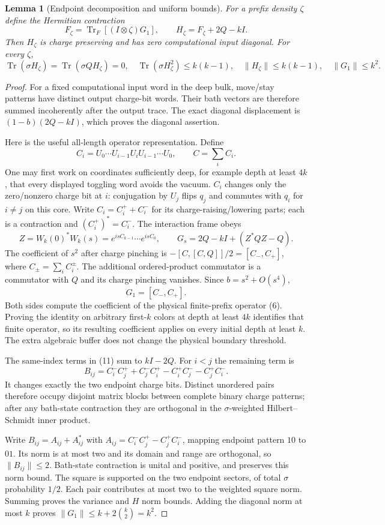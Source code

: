 \documentclass[11pt]{article}
\newtheorem{lemma}[theorem]{Lemma}
\newcommand{\Tr}{\operatorname{Tr}}
\newcommand{\norm}[1]{\lVert #1\rVert}
\begin{document}
\begin{lemma}[Endpoint decomposition and uniform bounds]\label{lem:endpoints}
For a prefix density $\zeta$ define the Hermitian contraction
\[
 F_\zeta=\Tr_F[(I\otimes\zeta)G_1],\qquad
 H_\zeta=F_\zeta+2Q-kI.
 \tag{7}
\]
Then $H_\zeta$ is charge preserving and has zero computational input
diagonal. For every $\zeta$,
\[
 \Tr(\sigma H_\zeta)=\Tr(\sigma QH_\zeta)=0,
 \quad \Tr(\sigma H_\zeta^2)\le k(k-1),
 \quad \norm{H_\zeta}\le k(k-1),\quad \norm{G_1}\le k^2.
 \tag{8}
\]
\end{lemma}
\begin{proof}
For a fixed computational input word in the deep bulk, move/stay
patterns have distinct output charge-bit words. Their bath vectors are
therefore summed incoherently after the output trace. The exact diagonal
displacement is $(1-b)(2Q-kI)$, which proves the diagonal assertion.

Here is the useful all-length operator representation. Define
\[
 C_i=U_0\cdots U_{i-1}U_iU_{i-1}\cdots U_0,
 \qquad C=\sum_iC_i.
 \tag{9}
\]
One may first work on coordinates sufficiently deep, for example depth
at least $4k$, that every displayed toggling word avoids the vacuum.
$C_i$ changes only the zero/nonzero charge bit at $i$: conjugation by
$U_j$ flips $q_j$ and commutes with $q_i$ for $i\ne j$ on this core.
Write $C_i=C_i^++C_i^-$ for its charge-raising/lowering parts; each
is a contraction and $(C_i^+)^*=C_i^-$. The interaction frame obeys
\[
 Z=W_k(0)^*W_k(s)=e^{isC_{k-1}}\cdots e^{isC_0},\qquad
 G_s=2Q-kI+(Z^*QZ-Q).
 \tag{10}
\]
The coefficient of $s^2$ after charge pinching is
$-[C,[C,Q]]/2=[C_-,C_+]$, where $C_\pm=\sum_iC_i^\pm$.
The additional ordered-product commutator is a commutator with $Q$
and its charge pinching vanishes. Since $b=s^2+O(s^4)$,
\[
 G_1=[C_-,C_+].
 \tag{11}
\]
Both sides compute the coefficient of the physical finite-prefix
operator (6). Proving the identity on arbitrary first-$k$ colors at
depth at least $4k$ identifies that finite operator, so its resulting
coefficient applies on every initial depth at least $k$. The extra
algebraic buffer does not change the physical boundary threshold.

The same-index terms in (11) sum to $kI-2Q$. For $i<j$ the remaining
term is
\[
 B_{ij}=C_i^-C_j^++C_j^-C_i^+-C_i^+C_j^--C_j^+C_i^-.
 \tag{12}
\]
It changes exactly the two endpoint charge bits. Distinct unordered
pairs therefore occupy disjoint matrix blocks between complete binary
charge patterns; after any bath-state contraction they are orthogonal
in the $\sigma$-weighted Hilbert--Schmidt inner product.

Write $B_{ij}=A_{ij}+A_{ij}^*$ with
$A_{ij}=C_i^-C_j^+-C_j^+C_i^-$, mapping endpoint pattern $10$ to
$01$. Its norm is at most two and its domain and range are orthogonal,
so $\norm{B_{ij}}\le2$. Bath-state contraction is unital and positive,
and preserves this norm bound. The square is supported on the two
endpoint sectors, of total $\sigma$ probability $1/2$. Each pair
contributes at most two to the weighted square norm. Summing proves
the variance and $H$ norm bounds. Adding the diagonal norm at most
$k$ proves $\norm{G_1}\le k+2\binom{k}{2}=k^2$.
\end{proof}
\end{document}

